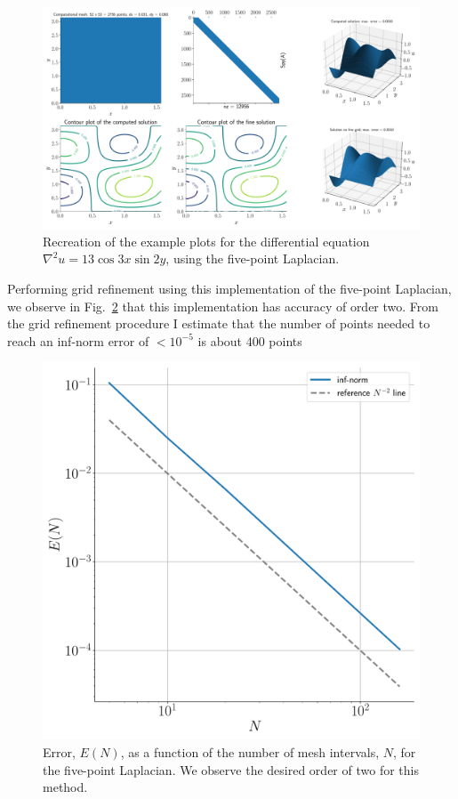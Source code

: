 \documentclass[12pt]{article}
\begin{document}
\begin{figure}[!h]
	\centering
	\includegraphics[clip,scale=0.4]{q2a_figure.pdf}
	\caption{Recreation of the example plots for the differential equation $\nabla^{2}u = 13\cos3x\sin2y$, using the five-point Laplacian.}
	\label{fig:five_pt_soln_recreation}
\end{figure}

Performing grid refinement using this implementation of the five-point Laplacian, we observe in Fig.~\ref{fig:five_pt_err_scaling} that this implementation has accuracy of order two. From the grid refinement procedure I estimate that the number of points needed to reach an inf-norm error of $<10^{-5}$ is about 400 points

\begin{figure}[!h]
	\centering
	\includegraphics[clip,scale=0.4]{q2a_err_fig.pdf}
	\caption{Error, $E(N)$, as a function of the number of mesh intervals, $N$, for the five-point Laplacian. We observe the desired order of two for this method.}
	\label{fig:five_pt_err_scaling}
\end{figure}
\end{document}
